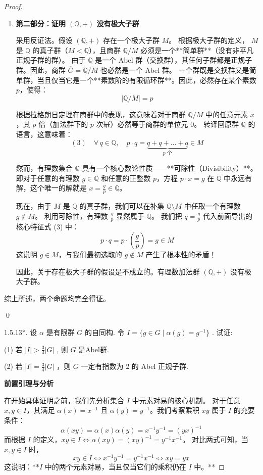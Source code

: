 \documentclass[]{article}
\begin{document}
\begin{proof}
\begin{enumerate}
	\item \textbf{第二部分：证明 $(\mathbb{Q}, +)$ 没有极大子群}
	
	采用反证法。假设 $(\mathbb{Q}, +)$ 存在一个极大子群 $M$。
	根据极大子群的定义， $M$ 是 $\mathbb{Q}$ 的真子群（$M < \mathbb{Q}$），且商群 $\mathbb{Q}/M$ 必须是一个**简单群**（没有非平凡正规子群的群）。
	由于 $\mathbb{Q}$ 是一个 Abel 群（交换群），其任何子群都是正规子群。因此，商群 $\overline{G} = \mathbb{Q}/M$ 也必然是一个 Abel 群。
	一个群既是交换群又是简单群，当且仅当它是一个**素数阶的有限循环群**。因此，必然存在某个素数 $p$，使得：
	\[ |\mathbb{Q}/M| = p \]
	
	根据拉格朗日定理在商群中的表现，这意味着对于商群 $\mathbb{Q}/M$ 中的任意元素 $\overline{x}$，其 $p$ 倍（加法群下的 $p$ 次幂）必然等于商群的单位元 $\overline{0}$。
	转译回原群 $\mathbb{Q}$ 的语言，这意味着：
	\[ (3) \quad \forall \, q \in \mathbb{Q}, \quad p \cdot q = \underbrace{q + q + \dots + q}_{p \text{ 个}} \in M \]
	
	然而，有理数集合 $\mathbb{Q}$ 具有一个核心数论性质——**可除性（Divisibility）**。即对于任意的有理数 $g \in \mathbb{Q}$ 和任意的正整数 $p$，方程 $p \cdot x = g$ 在 $\mathbb{Q}$ 中永远有解，这个唯一的解就是 $x = \frac{g}{p} \in \mathbb{Q}$。
	
	现在，由于 $M$ 是 $\mathbb{Q}$ 的真子群，我们可以在补集 $\mathbb{Q} \setminus M$ 中任取一个有理数 $g \notin M$。
	利用可除性，有理数 $\frac{g}{p}$ 显然属于 $\mathbb{Q}$。
	我们把 $q = \frac{g}{p}$ 代入前面导出的核心特征式 (3) 中：
	\[ p \cdot q = p \cdot \left(\frac{g}{p}\right) = g \in M \]
	这说明 $g \in M$，与我们最初选取的 $g \notin M$ 产生了根本性的矛盾！
	
	因此，关于存在极大子群的假设是不成立的。有理数加法群 $(\mathbb{Q}, +)$ 没有极大子群。
\end{enumerate}

\bigskip
综上所述，两个命题均完全得证。

\qed

1.5.13*. 设 $\alpha$ 是有限群 $G$ 的自同构. 令 $I = \{g \in G \mid \alpha(g) = g^{-1}\}$ . 试证: 

(1) 若 $|I| > \frac{3}{4} |G|$ , 则 $G$ 是Abel群. 

(2) 若 $|I| = \frac{3}{4} |G|$ ，则 $G$ 一定有指数为 2 的 Abel 正规子群. 

\bigskip
\noindent \textbf{前置引理与分析}

在开始具体证明之前，我们先分析集合 $I$ 中元素对易的核心机制。
对于任意 $x, y \in I$，其满足 $\alpha(x) = x^{-1}$ 且 $\alpha(y) = y^{-1}$。我们考察乘积 $xy$ 属于 $I$ 的充要条件：
\[ \alpha(xy) = \alpha(x)\alpha(y) = x^{-1}y^{-1} = (yx)^{-1} \]
而根据 $I$ 的定义，$xy \in I \iff \alpha(xy) = (xy)^{-1} = y^{-1}x^{-1}$。
对比两式可知，当 $x, y \in I$ 时，
\[ xy \in I \iff x^{-1}y^{-1} = y^{-1}x^{-1} \iff xy = yx \]
这说明：**$I$ 中的两个元素对易，当且仅当它们的乘积仍在 $I$ 中。**


\end{proof}
\end{document}
